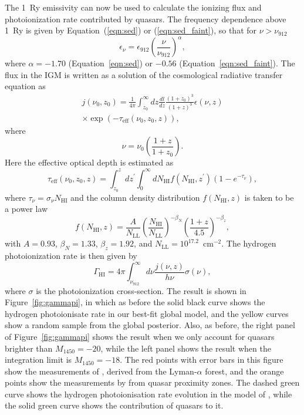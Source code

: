 \documentclass[a4paper,fleqn,usenatbib]{mnras}
\begin{document}
The 1~Ry emissivity can now be used to calculate the ionizing flux and
photoionization rate contributed by quasars.  The frequency dependence
above 1~Ry is given by Equation~(\ref{eqn:sed}) or
(\ref{eqn:sed_faint}), so that for $\nu > \nu_{912}$
\begin{equation}
  \epsilon_\nu = \epsilon_{912}\left(\frac{\nu}{\nu_{912}}\right)^\alpha,
  \label{eqn:epsilon_freq}
\end{equation}
where $\alpha=-1.70$ (Equation~\ref{eqn:sed}) or $-0.56$
(Equation~\ref{eqn:sed_faint}).  The flux in the IGM is
written as a solution of the cosmological radiative transfer equation
as \citep{2012ApJ...746..125H}
\begin{multline}
  j(\nu_0, z_0)=\frac{1}{4\pi}\int_{z_0}^\infty dz\frac{dl}{dz}\frac{(1+z_0)^3}{(1+z)^3}\epsilon(\nu,z)\\
  \times\exp{(-\tau_\mathrm{eff}(\nu_0, z_0, z))},
  \label{eqn:flux}
\end{multline}
where
\begin{equation}
  \nu = \nu_0\left(\frac{1+z}{1+z_0}\right).
\end{equation}
Here the effective optical depth is estimated as
\begin{equation}
  \tau_\mathrm{eff}(\nu_0, z_0, z) = \int_{z_0}^z dz^\prime\int_0^\infty dN_\mathrm{HI} f(N_\mathrm{HI}, z^\prime) (1-e^{-\tau_\nu}),
\end{equation}
where $\tau_\nu=\sigma_\nu N_\mathrm{HI}$ and the column density
distribution $f(N_\mathrm{HI}, z)$ is taken to be a power law \citep{2013MNRAS.436.1023B}
\begin{equation}
  f(N_\mathrm{HI}, z) = \frac{A}{N_\mathrm{LL}}\left(\frac{N_\mathrm{HI}}{N_\mathrm{LL}}\right)^{-\beta_N}\left(\frac{1+z}{4.5}\right)^{-\beta_z},
\end{equation}
with $A=0.93$, $\beta_N=1.33$, $\beta_z=1.92$, and
$N_\mathrm{LL}=10^{17.2}$~cm$^{-2}$.  The hydrogen photoionization
rate is then given by
\begin{equation}
  \Gamma_\mathrm{HI}=4\pi\int_{\nu_{912}}^\infty d\nu \frac{j(\nu,z)}{h\nu} \sigma(\nu),
\end{equation}
where $\sigma$ is the photoionization cross-section.  The result is
shown in Figure~\ref{fig:gammapi}, in which as before the solid black
curve shows the hydrogen photoionisate rate in our best-fit global
model, and the yellow curves show a random sample from the global
posterior.  Also, as before, the right panel of
Figure~\ref{fig:gammapi} shows the result when we only account for
quasars brighter than $M_{1450}=-20$, while the left panel shows the
result when the integration limit is $M_{1450}=-18$.  The red points
with error bars in this figure show the measurements of
\citet{2013MNRAS.436.1023B}, derived from the Lyman-$\alpha$ forest,
and the orange points show the measurements by
\citet{2011MNRAS.412.2543C} from quasar proximity zones.  The dashed
green curve shows the hydrogen photoionisation rate evolution in the
model of \citet{2012ApJ...746..125H}, while the solid green curve
shows the contribution of quasars to it.
\end{document}
